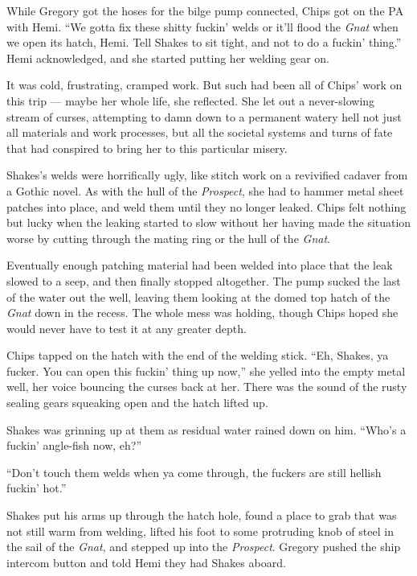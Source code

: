 \documentclass[
]{scrbook}
\begin{document}
While Gregory got the hoses for the bilge pump connected, Chips got on
the PA with Hemi. ``We gotta fix these shitty fuckin' welds or it'll
flood the \emph{Gnat} when we open its hatch, Hemi. Tell Shakes to sit
tight, and not to do a fuckin' thing.'' Hemi acknowledged, and she
started putting her welding gear on.

It was cold, frustrating, cramped work. But such had been all of Chips'
work on this trip --- maybe her whole life, she reflected. She let out a
never-slowing stream of curses, attempting to damn down to a permanent
watery hell not just all materials and work processes, but all the
societal systems and turns of fate that had conspired to bring her to
this particular misery.

Shakes's welds were horrifically ugly, like stitch work on a revivified
cadaver from a Gothic novel. As with the hull of the \emph{Prospect},
she had to hammer metal sheet patches into place, and weld them until
they no longer leaked. Chips felt nothing but lucky when the leaking
started to slow without her having made the situation worse by cutting
through the mating ring or the hull of the \emph{Gnat}.

Eventually enough patching material had been welded into place that the
leak slowed to a seep, and then finally stopped altogether. The pump
sucked the last of the water out the well, leaving them looking at the
domed top hatch of the \emph{Gnat} down in the recess. The whole mess
was holding, though Chips hoped she would never have to test it at any
greater depth.

Chips tapped on the hatch with the end of the welding stick. ``Eh,
Shakes, ya fucker. You can open this fuckin' thing up now,'' she yelled
into the empty metal well, her voice bouncing the curses back at her.
There was the sound of the rusty sealing gears squeaking open and the
hatch lifted up.

Shakes was grinning up at them as residual water rained down on him.
``Who's a fuckin' angle-fish now, eh?''

``Don't touch them welds when ya come through, the fuckers are still
hellish fuckin' hot.''

Shakes put his arms up through the hatch hole, found a place to grab
that was not still warm from welding, lifted his foot to some protruding
knob of steel in the sail of the \emph{Gnat}, and stepped up into the
\emph{Prospect}. Gregory pushed the ship intercom button and told Hemi
they had Shakes aboard.
\end{document}

